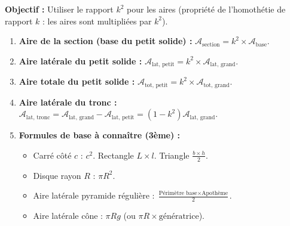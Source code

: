 \documentclass[11pt]{article}
\begin{document}
\begin{methode}
    \textbf{Objectif :} Utiliser le rapport $k^2$ pour les aires (propriété de l'homothétie de rapport $k$ : les aires sont multipliées par $k^2$).
    \begin{enumerate}
        \item \textbf{Aire de la section (base du petit solide) :} $\mathcal{A}_{\text{section}} = k^2 \times \mathcal{A}_{\text{base}}$.
        \item \textbf{Aire latérale du petit solide :} $\mathcal{A}_{\text{lat, petit}} = k^2 \times \mathcal{A}_{\text{lat, grand}}$.
        \item \textbf{Aire totale du petit solide :} $\mathcal{A}_{\text{tot, petit}} = k^2 \times \mathcal{A}_{\text{tot, grand}}$.
        \item \textbf{Aire latérale du tronc :} $\mathcal{A}_{\text{lat, tronc}} = \mathcal{A}_{\text{lat, grand}} - \mathcal{A}_{\text{lat, petit}} = (1 - k^2) \mathcal{A}_{\text{lat, grand}}$.
        \item \textbf{Formules de base à connaître (3ème) :}
            \begin{itemize}
                \item Carré côté $c$ : $c^2$. Rectangle $L \times l$. Triangle $\frac{b \times h}{2}$.
                \item Disque rayon $R$ : $\pi R^2$.
                \item Aire latérale pyramide régulière : $\frac{\text{Périmètre base} \times \text{Apothème}}{2}$.
                \item Aire latérale cône : $\pi R g$ (ou $\pi R \times \text{génératrice}$).
            \end{itemize}
    \end{enumerate}
\end{methode}
\end{document}
